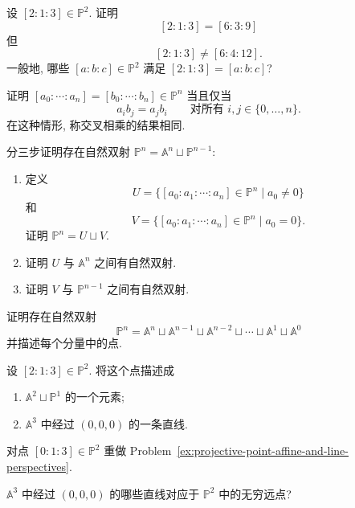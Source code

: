 \BookExerciseHeading
\begin{BookExercises}
  \item\label{ex:compare-projective-coordinate-representatives} 设 $[2:1:3]\in\mathbb{P}^{2}$. 证明
  \[
    [2:1:3]=[6:3:9]
  \]
  但
  \[
    [2:1:3]\neq[6:4:12].
  \]
  一般地, 哪些 $[a:b:c]\in\mathbb{P}^{2}$ 满足 $[2:1:3]=[a:b:c]$?
  \item\label{ex:cross-multiplied-projective-coordinates} 证明 $[a_{0}:\cdots:a_{n}]=[b_{0}:\cdots:b_{n}]\in\mathbb{P}^{n}$ 当且仅当
  \[
    a_{i}b_{j}=a_{j}b_{i}\qquad\text{对所有 }i,j\in\{0,\ldots,n\}.
  \]
  在这种情形, 称交叉相乘的结果相同.
  \item\label{ex:projective-space-affine-part-and-infinity} 分三步证明存在自然双射 $\mathbb{P}^{n}=\mathbb{A}^{n}\sqcup\mathbb{P}^{n-1}$:
  \begin{enumerate}
    \item 定义
    \[
      U=\{[a_{0}:a_{1}:\cdots:a_{n}]\in\mathbb{P}^{n}\mid a_{0}\neq0\}
    \]
    和
    \[
      V=\{[a_{0}:a_{1}:\cdots:a_{n}]\in\mathbb{P}^{n}\mid a_{0}=0\}.
    \]
    证明 $\mathbb{P}^{n}=U\sqcup V$.
    \item 证明 $U$ 与 $\mathbb{A}^{n}$ 之间有自然双射.
    \item 证明 $V$ 与 $\mathbb{P}^{n-1}$ 之间有自然双射.
  \end{enumerate}
  \item\label{ex:projective-space-disjoint-affine-decomposition} 证明存在自然双射
  \[
    \mathbb{P}^{n}=\mathbb{A}^{n}\sqcup\mathbb{A}^{n-1}\sqcup\mathbb{A}^{n-2}
      \sqcup\cdots\sqcup\mathbb{A}^{1}\sqcup\mathbb{A}^{0}
  \]
  并描述每个分量中的点.
  \item\label{ex:projective-point-affine-and-line-perspectives} 设 $[2:1:3]\in\mathbb{P}^{2}$. 将这个点描述成
  \begin{enumerate}
    \item $\mathbb{A}^{2}\sqcup\mathbb{P}^{1}$ 的一个元素;
    \item $\mathbb{A}^{3}$ 中经过 $(0,0,0)$ 的一条直线.
  \end{enumerate}
  \item\label{ex:projective-infinity-point-affine-and-line-perspectives} 对点 $[0:1:3]\in\mathbb{P}^{2}$ 重做 Problem~\ref{ex:projective-point-affine-and-line-perspectives}.
  \item\label{ex:origin-lines-projecting-to-infinity} $\mathbb{A}^{3}$ 中经过 $(0,0,0)$ 的哪些直线对应于 $\mathbb{P}^{2}$ 中的无穷远点?
\end{BookExercises}
